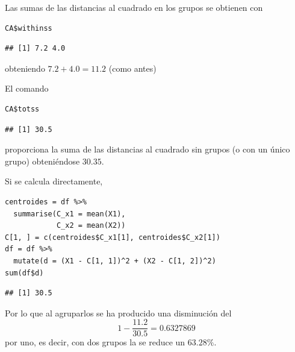 Las sumas de las distancias al cuadrado en los grupos se obtienen con
\begin{lstlisting}
CA$withinss
\end{lstlisting}
\begin{verbatim}
## [1] 7.2 4.0
\end{verbatim}
obteniendo $7.2+4.0=11.2$ (como antes)

El comando 
\begin{lstlisting}
CA$totss
\end{lstlisting}
\begin{verbatim}
## [1] 30.5
\end{verbatim}
proporciona la suma de las distancias al cuadrado sin grupos (o con un único grupo) obteniéndose $30.35$.

Si se calcula directamente,
\begin{lstlisting}
centroides = df %>% 
  summarise(C_x1 = mean(X1),
            C_x2 = mean(X2))
C[1, ] = c(centroides$C_x1[1], centroides$C_x2[1])
df = df %>%
  mutate(d = (X1 - C[1, 1])^2 + (X2 - C[1, 2])^2)
sum(df$d)
\end{lstlisting}
\begin{verbatim}
## [1] 30.5
\end{verbatim}
Por lo que al agruparlos se ha producido una disminución del \[ 1-\dfrac{11.2}{30.5}=0.6327869 \] por uno, es decir, con dos grupos la  se reduce un $63.28\%$.

